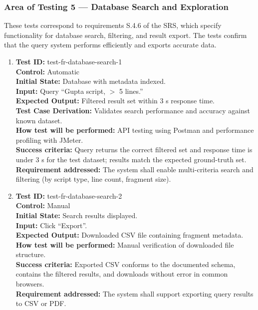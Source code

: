 \documentclass[12pt, titlepage]{article}
\begin{document}
\subsubsection{Area of Testing 5 — Database Search and Exploration}

These tests correspond to requirements S.4.6 of the SRS, which specify functionality for database search, filtering, and result export. The tests confirm that the query system performs efficiently and exports accurate data.

\begin{enumerate}
\item
\textbf{Test ID:} test-fr-database-search-1\\
\textbf{Control:} Automatic\\
\textbf{Initial State:} Database with metadata indexed.\\
\textbf{Input:} Query ``Gupta script, $>$ 5 lines.''\\
\textbf{Expected Output:} Filtered result set within 3 s response time.\\
\textbf{Test Case Derivation:} Validates search performance and accuracy against known dataset.\\
\textbf{How test will be performed:} API testing using Postman and performance profiling with JMeter.\\
\textbf{Success criteria:} Query returns the correct filtered set and response time is under 3 s for the test dataset; results match the expected ground-truth set.\\
\textbf{Requirement addressed:} The system shall enable multi-criteria search and filtering (by script type, line count, fragment size).\\

\item
\textbf{Test ID:} test-fr-database-search-2\\
\textbf{Control:} Manual\\
\textbf{Initial State:} Search results displayed.\\
\textbf{Input:} Click ``Export''.\\
\textbf{Expected Output:} Downloaded CSV file containing fragment metadata.\\
\textbf{How test will be performed:} Manual verification of downloaded file structure.\\
\textbf{Success criteria:} Exported CSV conforms to the documented schema, contains the filtered results, and downloads without error in common browsers.\\
\textbf{Requirement addressed:} The system shall support exporting query results to CSV or PDF.\\
\end{enumerate}
\end{document}
